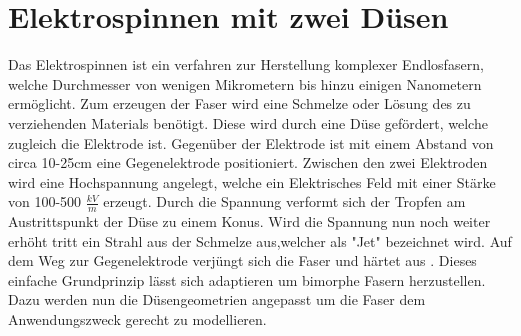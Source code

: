 \section{Elektrospinnen mit zwei Düsen}

Das Elektrospinnen ist ein verfahren zur Herstellung komplexer Endlosfasern, welche Durchmesser von wenigen Mikrometern bis hinzu einigen Nanometern ermöglicht. Zum erzeugen der Faser wird eine Schmelze oder Lösung des zu verziehenden Materials benötigt. Diese wird durch eine Düse gefördert, welche zugleich die Elektrode ist. Gegenüber der Elektrode ist mit einem Abstand von circa 10-25cm eine Gegenelektrode positioniert. Zwischen den zwei Elektroden wird eine Hochspannung angelegt, welche ein Elektrisches Feld mit einer Stärke von 100-500 $\frac{kV}{m}$ erzeugt. Durch die Spannung verformt sich der Tropfen am Austrittspunkt der Düse zu einem Konus. Wird die Spannung nun noch weiter erhöht tritt ein Strahl aus der Schmelze aus,welcher als "Jet" bezeichnet wird. Auf dem Weg zur Gegenelektrode verjüngt sich die Faser und härtet aus \cite{Greiner.2007}. Dieses einfache Grundprinzip lässt sich adaptieren um bimorphe Fasern herzustellen. Dazu werden nun die Düsengeometrien angepasst um die Faser dem Anwendungszweck gerecht zu modellieren. 



